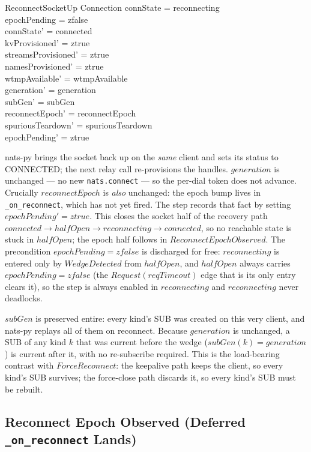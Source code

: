 \documentclass[a4paper,10pt,fleqn]{article}
\begin{document}
\begin{schema}{ReconnectSocketUp}
  \Delta Connection
  \where
  connState = reconnecting \\
  epochPending = zfalse \\
  connState' = connected \\
  kvProvisioned' = ztrue \\
  streamsProvisioned' = ztrue \\
  namesProvisioned' = ztrue \\
  wtmpAvailable' = wtmpAvailable \\
  generation' = generation \\
  subGen' = subGen \\
  reconnectEpoch' = reconnectEpoch \\
  spuriousTeardown' = spuriousTeardown \\
  epochPending' = ztrue
\end{schema}

nats-py brings the socket back up on the \emph{same} client and sets its
status to CONNECTED; the next relay call re-provisions the handles.
$generation$ is unchanged --- no new \texttt{nats.connect} --- so the
per-dial token does not advance.  Crucially $reconnectEpoch$ is
\emph{also} unchanged: the epoch bump lives in
\texttt{\_on\_reconnect}, which has not yet fired.  The step records that
fact by setting $epochPending' = ztrue$.  This closes the socket half of
the recovery path $connected \to halfOpen \to reconnecting \to
connected$, so no reachable state is stuck in $halfOpen$; the epoch half
follows in $ReconnectEpochObserved$.  The precondition $epochPending =
zfalse$ is discharged for free: $reconnecting$ is entered only by
$WedgeDetected$ from $halfOpen$, and $halfOpen$ always carries
$epochPending = zfalse$ (the $Request(reqTimeout)$ edge that is its only
entry clears it), so the step is always enabled in $reconnecting$ and
$reconnecting$ never deadlocks.

$subGen$ is preserved entire: every kind's SUB was created on this very
client, and nats-py replays all of them on reconnect.  Because $generation$
is unchanged, a SUB of any kind $k$ that was current before the wedge
($subGen(k) = generation$) is current after it, with no re-subscribe
required.  This is the load-bearing contrast with $ForceReconnect$: the
keepalive path keeps the client, so every kind's SUB survives; the
force-close path discards it, so every kind's SUB must be rebuilt.

\subsection{Reconnect Epoch Observed (Deferred \texttt{\_on\_reconnect}
Lands)}
\end{document}

